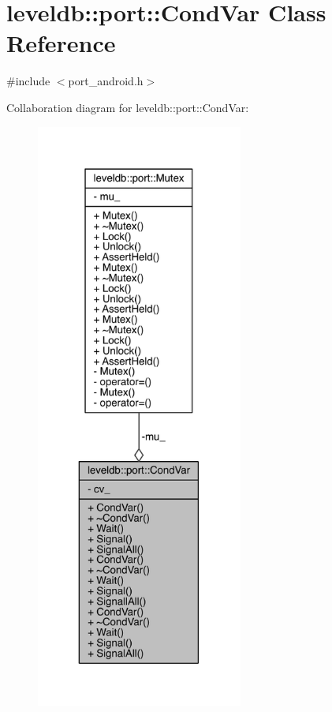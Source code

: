 \hypertarget{classleveldb_1_1port_1_1_cond_var}{}\section{leveldb\+:\+:port\+:\+:Cond\+Var Class Reference}
\label{classleveldb_1_1port_1_1_cond_var}


{\ttfamily \#include $<$port\+\_\+android.\+h$>$}



Collaboration diagram for leveldb\+:\+:port\+:\+:Cond\+Var\+:\nopagebreak
\begin{figure}[H]
\begin{center}
\leavevmode
\includegraphics[height=550pt]{classleveldb_1_1port_1_1_cond_var__coll__graph}
\end{center}
\end{figure}
